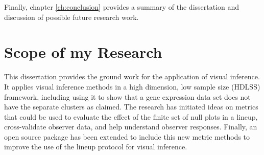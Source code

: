 %

Finally, chapter \ref{ch:conclusion} provides a summary of the dissertation and discussion of possible future research work. 

\section{Scope of my Research}

This dissertation provides the ground work for the application of visual inference. It applies visual inference methods in a high dimension, low sample size (HDLSS) framework, including using it to show that a gene expression data set does not have the separate clusters as claimed. The research has initiated ideas on metrics that could be used to evaluate the effect of the finite set of null plots in a lineup, cross-validate observer data, and help understand observer responses.  Finally, an open source package has been extended to include this new metric methods to improve the use of the lineup protocol for visual inference. 


